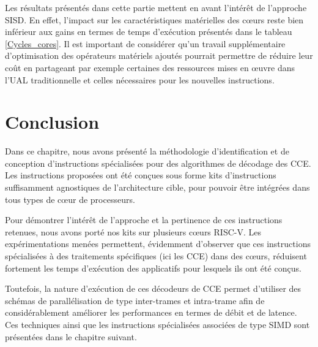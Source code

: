 \documentclass[../main.tex]{subfiles}
\begin{document}
Les résultats présentés dans cette partie mettent en avant l'intérêt de l'approche SISD. En effet, l'impact sur les caractéristiques matérielles des cœurs reste bien inférieur aux gains en termes de temps d'exécution présentés dans le tableau \ref{Cycles_cores}. Il est important de considérer qu'un travail supplémentaire d'optimisation des opérateurs matériels ajoutés pourrait permettre de réduire leur coût en partageant par exemple certaines des ressources mises en œuvre dans l'UAL traditionnelle et celles nécessaires pour les nouvelles instructions. 



%
%
%
\section{Conclusion}
%
%
%
Dans ce chapitre, nous avons présenté la méthodologie d'identification et de conception d'instructions spécialisées pour des algorithmes de décodage des CCE. Les instructions proposées ont été conçues sous forme kits d'instructions suffisamment agnostiques de l'architecture cible, pour pouvoir être intégrées dans tous types de cœur de processeurs.

Pour démontrer l'intérêt de l'approche et la pertinence de ces instructions retenues, nous avons porté nos kits sur plusieurs cœurs RISC-V. Les expérimentations menées permettent, évidemment d'observer que ces instructions spécialisées à des traitements spécifiques (ici les CCE) dans des cœurs, réduisent fortement les temps d'exécution des applicatifs pour lesquels ils ont été conçus.

Toutefois, la nature d'exécution de ces décodeurs de CCE permet d'utiliser des schémas de parallélisation de type inter-trames et intra-trame afin de considérablement améliorer les performances en termes de débit et de latence. Ces techniques ainsi que les instructions spécialisées associées de type SIMD sont présentées dans le chapitre suivant.
\end{document}
